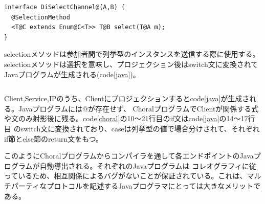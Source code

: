 \documentclass{thesis}
\begin{document}
\begin{lstlisting}[caption=selectionメソッドの定義,label=select]
interface DiSelectChannel@(A,B) {
  @SelectionMethod
  <T@C extends Enum@C<T>> T@B select(T@A m);
} 
\end{lstlisting}
selectionメソッドは参加者間で列挙型のインスタンスを送信する際に使用する。
selectionメソッドは選択を意味し、プロジェクション後はswitch文に変換されてJavaプログラムが生成される(code\ref{java})。
\begin{lstlisting}[caption=生成されたClientのJavaプログラム(分散認証),label=java]

\end{lstlisting}
Client,Service,IPのうち、Clientにプロジェクションするとcode\ref{java}が生成される。Javaプログラムには@が存在せず、
ChoralプログラムでClientが関係する式や文のみ射影後に残る。code\ref{choral}の10〜21行目のif文はcode\ref{java}の14〜17行目
のswitch文に変換されており、caseは列挙型の値で場合分けされて、それぞれif節とelse節のreturn文をもつ。

このようにChoralプログラムからコンパイラを通して各エンドポイントのJavaプログラムが自動導出される。それぞれのJavaプログラムは
コレオグラフィに従っているため、相互関係によるバグがないことが保証されている。これは、マルチパーティなプロトコルを記述するJavaプログラマにとっては大きなメリットである。

\end{document}

